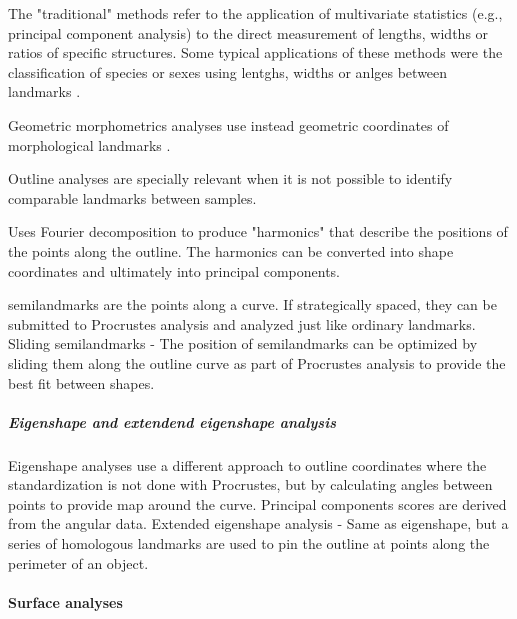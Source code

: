 The "traditional" methods refer to the application of multivariate statistics (e.g., principal component analysis) to the direct measurement of lengths, widths or ratios of specific structures. Some typical applications of these methods were the classification of species or sexes \citep{Jolicoeur1960} using lentghs, widths or anlges between landmarks \citep{Dryden1998}.

Geometric morphometrics analyses use instead geometric coordinates of morphological landmarks \citep{zelditch2012geometric}. 

Outline analyses are specially relevant when it is not possible to identify comparable landmarks between samples. 


Uses Fourier decomposition to produce "harmonics" that describe the positions of the points along the outline. The harmonics can be converted into shape coordinates and ultimately into principal components.

 semilandmarks are the points along a curve. If strategically spaced, they can be submitted to Procrustes analysis and analyzed just like ordinary landmarks.
Sliding semilandmarks - The position of semilandmarks can be optimized by sliding them along the outline curve as part of Procrustes analysis to provide the best fit between shapes. 

\subparagraph{Eigenshape and extendend eigenshape analysis} 
Eigenshape analyses use a different approach to outline coordinates where the standardization is not done with Procrustes, but by calculating angles between points to provide map around the curve. Principal components scores are derived from the angular data. Extended eigenshape analysis - Same as eigenshape, but a series of homologous landmarks are used to pin the outline at points along the perimeter
of an object.



\paragraph{Surface analyses}

%
%
%
